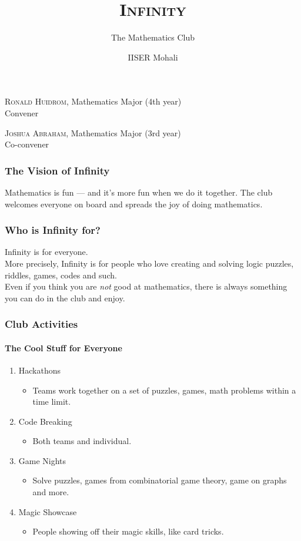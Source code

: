 \documentclass[10pt, aspectratio=43,leqno]{beamer}
\title{\textsc{Infinity}}
\subtitle{The Mathematics Club}
\author{IISER Mohali}
\begin{document}
\begin{frame}
  \titlepage
\end{frame}

\begin{frame}
  \textsc{Ronald Huidrom}, Mathematics Major (4th year) \\
  {\color{blue} Convener} \\
  \vspace*{.5cm}
  
  \textsc{Joshua Abraham}, Mathematics Major (3rd year) \\
  {\color{blue} Co-convener} \\
\end{frame}

\begin{frame}
  \frametitle{The Vision of Infinity}
  Mathematics is fun --- and it's more fun when we do it together. The club welcomes everyone on board and spreads the joy of doing mathematics. \\
\end{frame}

\begin{frame}
  \frametitle{Who is Infinity for?}
  \pause
  Infinity is for everyone. \pause \\
  \vspace*{.5cm}
  More precisely, Infinity is for people who love creating and solving logic puzzles, riddles, games, codes and such. \pause\\
  \vspace*{.5cm}
  Even if you think you are \emph{not} good at mathematics, there is always something you can do in the club and enjoy.
\end{frame}

\begin{frame}
  \frametitle{Club Activities}
  \framesubtitle{The Cool Stuff for Everyone}
  \pause
\begin{enumerate}
\item\label{item:1} Hackathons 
\begin{itemize}
\item\label{item:2} Teams work together on a set of puzzles, games, math problems within a time limit.
\end{itemize}
\pause
\item\label{item:3} Code Breaking 
\begin{itemize}
\item Both teams and individual.
\end{itemize}
\pause
\item\label{item:4} Game Nights 
\begin{itemize}
\item Solve puzzles, games from combinatorial game theory, game on graphs and more.
\end{itemize}
\pause 
\item\label{item:5} Magic Showcase 
\begin{itemize}
\item People showing off their magic skills, like card tricks.
\end{itemize}
\end{enumerate}
\end{frame}
\end{document}
